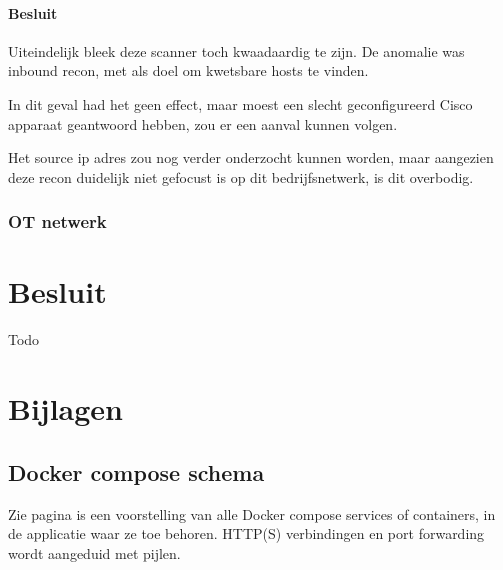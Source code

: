 \documentclass[a4paper,12pt]{report}
\begin{document}
\subsubsection{Besluit}
Uiteindelijk bleek deze scanner toch kwaadaardig te zijn.
De anomalie was inbound recon, met als doel om kwetsbare hosts te vinden.

In dit geval had het geen effect, maar moest een slecht geconfigureerd Cisco apparaat geantwoord hebben, zou er een aanval kunnen volgen.

Het source ip adres zou nog verder onderzocht kunnen worden, maar aangezien deze recon duidelijk niet gefocust is op dit bedrijfsnetwerk, is dit overbodig.


\subsection{OT netwerk}



\chapter*{Besluit}
Todo

\chapter*{Bijlagen}

\section*{Docker compose schema}
Zie pagina \pageref{bijlage:aangepast-systeem-schema-docker} is een voorstelling van alle Docker compose services of containers, in de applicatie waar ze toe behoren.
HTTP(S) verbindingen en port forwarding wordt aangeduid met pijlen.



\printbibliography
{}

\newpage
\thispagestyle{empty}
\mbox{}

\newpage
\thispagestyle{empty}
\mbox{}
\end{document}
